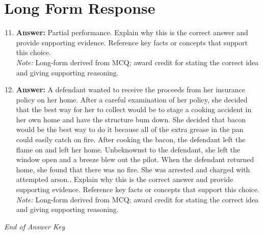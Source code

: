 \documentclass[12pt]{article}
\begin{document}
\section*{Long Form Response}
\begin{enumerate}[label=\arabic*.]
\setcounter{enumi}{10}
\item \textbf{Answer:} Partial performance. Explain why this is the correct answer and provide supporting evidence. Reference key facts or concepts that support this choice.
\\ \textit{Note:} Long-form derived from MCQ; award credit for stating the correct idea and giving supporting reasoning.
\item \textbf{Answer:} A defendant wanted to receive the proceeds from her insurance policy on her home. After a careful examination of her policy, she decided that the best way for her to collect would be to stage a cooking accident in her own home and have the structure bum down. She decided that bacon would be the best way to do it because all of the extra grease in the pan could easily catch on fire. After cooking the bacon, the defendant left the flame on and left her home. Unbeknownst to the defendant, she left the window open and a breeze blew out the pilot. When the defendant returned home, she found that there was no fire. She was arrested and charged with attempted arson.. Explain why this is the correct answer and provide supporting evidence. Reference key facts or concepts that support this choice.
\\ \textit{Note:} Long-form derived from MCQ; award credit for stating the correct idea and giving supporting reasoning.
\end{enumerate}

\vfill
\noindent\textit{End of Answer Key}
\end{document}
